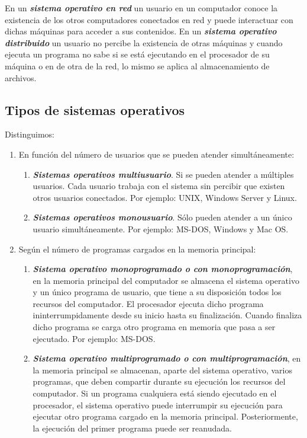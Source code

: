 \documentclass[12pt]{article}
\begin{document}
En un \textbf{\textit{sistema operativo en red}} un usuario en un computador conoce la existencia de los otros computadores conectados en red y puede interactuar con dichas máquinas para acceder a sus contenidos. En un \textbf{\textit{sistema operativo distribuido}} un usuario no percibe la existencia de otras máquinas y cuando ejecuta un programa no sabe si se está ejecutando en el procesador de su máquina o en de otra de la red, lo mismo se aplica al almacenamiento de archivos.

\subsection{Tipos de sistemas operativos}

Distinguimos: 
\begin{enumerate}
\item En función del número de usuarios que se pueden atender simultáneamente:
\begin{enumerate}
\item \textbf{\textit{Sistemas operativos multiusuario}}. Si se pueden atender a múltiples usuarios. Cada usuario trabaja con el sistema sin percibir que existen otros usuarios conectados. Por ejemplo: UNIX, Windows Server y Linux.

\item \textbf{\textit{Sistemas operativos monousuario}}. Sólo pueden atender a un único usuario simultáneamente. Por ejemplo: MS-DOS, Windows y Mac OS.

\end{enumerate}
\item Según el número de programas cargados en la memoria principal:
\begin{enumerate}
\item \textbf{\textit{Sistema operativo monoprogramado o con monoprogramación}}, en la memoria principal del computador se almacena el sistema operativo y un único programa de usuario, que tiene a su disposición todos los recursos del computador. El procesador ejecuta dicho programa ininterrumpidamente desde su inicio hasta su finalización. Cuando finaliza dicho programa se carga otro programa en memoria que pasa a ser ejecutado. Por ejemplo: MS-DOS.

\item \textbf{\textit{Sistema operativo multiprogramado o con multiprogramación}}, en la memoria principal se almacenan, aparte del sistema operativo, varios programas, que deben compartir durante su ejecución los recursos del computador. Si un programa cualquiera está siendo ejecutado en el procesador, el sistema operativo puede interrumpir su ejecución para ejecutar otro programa cargado en la memoria principal. Posteriormente, la ejecución del primer programa puede ser reanudada.


\end{enumerate}
\end{enumerate}
\end{document}
